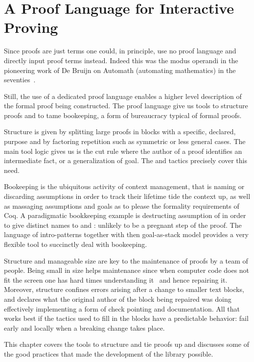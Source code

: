 \chapter{A Proof Language for Interactive Proving}{}
\label{ch:script}


Since proofs are just terms one could, in principle, use no proof
language and directly input proof terms instead.  Indeed this was the
modus operandi in the pioneering work of De Bruijn on Automath
(automating mathematics) in the seventies~\cite{nederpelt-94}.

Still, the use of a dedicated proof language enables a higher level
description of the formal proof being constructed.  
The \mcbSSR{} proof language give us tools to structure proofs and
to tame bookeeping, a form of bureaucracy typical of formal proofs.

Structure is given by splitting large proofs in blocks with a
specific, declared, purpose and by factoring repetition such as
symmetric or less general cases. The main tool logic gives us is the
cut rule where the author of a proof identifies an intermediate fact,
or a generalization of goal. The  and  tactics
precisely cover this need.

Bookeeping is the ubiquitous activity of context management, that is
naming or discarding assumptions in order to track their lifetime tide
the context up, as well as massaging assumptions and goals as to
please the formality requirements of Coq.  A paradigmatic bookkeeping
example is destructing assumption of  in order to give
distinct names to  and : unlikely to be a pregnant step of
the proof.  The language of intro-patterns together with then
goal-as-stack model provides a very flexible tool to
succinctly deal with bookeeping.

Structure and manageable size are key to the maintenance of proofs by
a team of people.  Being small in size helps maintenance since when
computer code does not fit the screen one has hard times understanding
it~\cite{Weinberg:1985:PCP:536771} and hence repairing it.  Moreover,
structure confines errors arising after a change to smaller text
blocks, and declares what the original author of the block being
repaired was doing effectively implementing a form of check pointing
and documentation.  All that works best if the tactics used to fill in
the blocks have a predictable behavior: fail early and locally when a
breaking change takes place.

This chapter covers the tools to structure and tie proofs up and discusses
some of the good practices that made the development of the \mcbMC{}
library possible.

